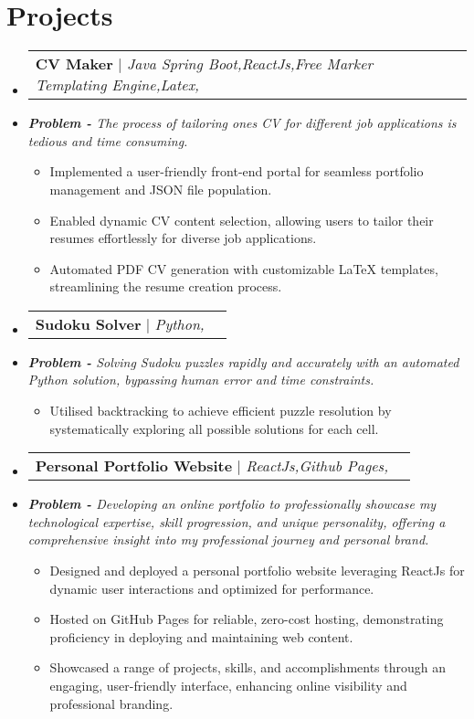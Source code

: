 \documentclass[letterpaper,11pt]{article}
\makeatletter
\newcommand{\resumeItem}[1]{
  \item\small{
    {#1 \vspace{-2pt}}
  }
}
\newcommand{\resumeProjectHeading}[2]{
    \item
    \begin{tabular*}{0.97\textwidth}{l@{\extracolsep{\fill}}r}
      \small#1 & #2 \\
    \end{tabular*}\vspace{-7pt}
}
\newcommand{\resumeSubHeadingListStart}{\begin{itemize}[leftmargin=0.15in, label={}]}
\newcommand{\resumeSubHeadingListEnd}{\end{itemize}}
\newcommand{\resumeItemListStart}{\begin{itemize}}
\newcommand{\resumeItemListEnd}{\end{itemize}\vspace{-5pt}}
\makeatother
\begin{document}
    \section{Projects}
        \resumeSubHeadingListStart
                \resumeProjectHeading
                    {\textbf{CV Maker} $|$ \emph{Java Spring Boot,ReactJs,Free Marker Templating Engine,Latex,}}{}
                    \resumeItem{\textit{\textbf{Problem - } The process of tailoring ones CV for different job applications is tedious and time consuming.}}
                    \resumeItemListStart
                            \resumeItem{Implemented a user-friendly front-end portal for seamless portfolio management and JSON file population.}
                            \resumeItem{Enabled dynamic CV content selection, allowing users to tailor their resumes effortlessly for diverse job applications.}
                            \resumeItem{Automated PDF CV generation with customizable LaTeX templates, streamlining the resume creation process.}
                    \resumeItemListEnd
                \resumeProjectHeading
                    {\textbf{Sudoku Solver} $|$ \emph{Python,}}{}
                    \resumeItem{\textit{\textbf{Problem - } Solving Sudoku puzzles rapidly and accurately with an automated Python solution, bypassing human error and time constraints.}}
                    \resumeItemListStart
                            \resumeItem{Utilised backtracking to achieve efficient puzzle resolution by systematically exploring all possible solutions for each cell.}
                    \resumeItemListEnd
                \resumeProjectHeading
                    {\textbf{Personal Portfolio Website} $|$ \emph{ReactJs,Github Pages,}}{}
                    \resumeItem{\textit{\textbf{Problem - } Developing an online portfolio to professionally showcase my technological expertise, skill progression, and unique personality, offering a comprehensive insight into my professional journey and personal brand.}}
                    \resumeItemListStart
                            \resumeItem{Designed and deployed a personal portfolio website leveraging ReactJs for dynamic user interactions and optimized for performance.}
                            \resumeItem{Hosted on GitHub Pages for reliable, zero-cost hosting, demonstrating proficiency in deploying and maintaining web content.}
                            \resumeItem{Showcased a range of projects, skills, and accomplishments through an engaging, user-friendly interface, enhancing online visibility and professional branding.}
                    \resumeItemListEnd
        \resumeSubHeadingListEnd
\end{document}
